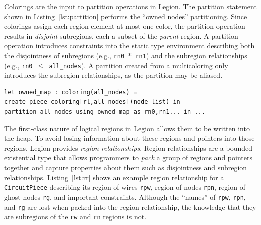 Colorings are the input to partition operations in Legion.  The partition
statement shown in Listing~\ref{lst:partition} performs the ``owned nodes''
partitioning.    Since colorings assign each region element at most one color,
the partition operation results in 
{\em disjoint} subregions, each a subset of the {\em parent} region.
A partition operation introduces constraints into the static type environment describing
both the disjointness of subregions (e.g., {\tt rn0 $*$ rn1})
and the subregion relationships
(e.g., {\tt rn0 $\leq$ all\_nodes}).  A partition created from a multicoloring
only introduces the subregion relationships, as the partition may be aliased.




\begin{lstlisting}[label={lst:partition},caption={Partition Operation Example}]
let owned_map : coloring(all_nodes) = create_piece_coloring[rl,all_nodes](node_list) in
partition all_nodes using owned_map as rn0,rn1... in ...
\end{lstlisting}



The first-class nature of logical regions in Legion allows them to
be written into the heap.  To avoid losing information about these regions and pointers
into those regions, Legion provides {\em region
relationships}.  Region relationships are a bounded existential type
that allows programmers to {\em pack} a group of regions and pointers together and capture
properties about them such as disjointness and subregion relationships.
Listing~\ref{lst:rr} shows an example region relationship for a {\tt CircuitPiece} 
describing its region of wires {\tt rpw}, region of 
nodes {\tt rpn}, region of ghost nodes {\tt rg}, and important constraints.  Although the
``names'' of {\tt rpw}, {\tt rpn}, and {\tt rg} are lost when packed into the region relationship,
the knowledge that they are subregions of the {\tt rw} and {\tt rn} regions is not.

